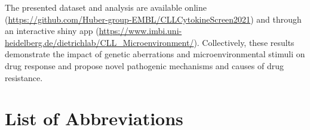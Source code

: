 \documentclass[11pt, a4paper, twosided]{book}
\begin{document}
    The presented dataset and analysis are available online (\url{https://github.com/Huber-group-EMBL/CLLCytokineScreen2021}) and through an interactive shiny app (\url{https://www.imbi.uni-heidelberg.de/dietrichlab/CLL_Microenvironment/}). Collectively, these results demonstrate the impact of genetic aberrations and microenvironmental stimuli on drug response and propose novel pathogenic mechanisms and causes of drug resistance.
\newpage\null\newpage

\newpage
\tableofcontents
\clearpage

\newpage
\hypertarget{list-of-abbreviations}{%
\chapter*{List of Abbreviations}\label{list-of-abbreviations}}
\end{document}
